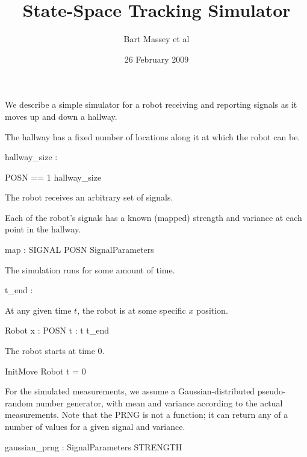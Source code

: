 \documentclass{article}
\title{State-Space Tracking Simulator}
\author{Bart Massey et al}
\date{26 February 2009}
\begin{document}
\maketitle

We describe a simple simulator for a robot receiving and reporting signals as it moves up and down a
hallway.

The hallway has a fixed number of locations along it at which the robot can be.

\begin{axdef}
  hallway\_size : \nat
\end{axdef}
\begin{zed}
  POSN == 1 \upto hallway\_size
\end{zed}

The robot receives an arbitrary set of signals.

\begin{zed}
\end{zed}

Each of the robot's signals has a known (mapped) strength and variance at each point in the hallway.

\begin{axdef}
  map : SIGNAL \fun POSN \fun SignalParameters
\end{axdef}

The simulation runs for some amount of time.
\begin{axdef}
  t\_end : \nat
\end{axdef}

At any given time $t$, the robot is at some specific $x$ position.
\begin{schema}{Robot}
  x : POSN \also
  t : \nat
  \where
  t \leq t\_end
\end{schema}

The robot starts at time 0.

\begin{schema}{InitMove}
  Robot
  \where
  t = 0
\end{schema}

For the simulated measurements, we assume a Gaussian-distributed pseudo-random number generator,
with mean and variance according to the actual measurements.  Note that the PRNG is not a function;
it can return any of a number of values for a given signal and variance.

\begin{axdef}
  gaussian\_prng : SignalParameters \rel STRENGTH
\end{axdef}
\end{document}
